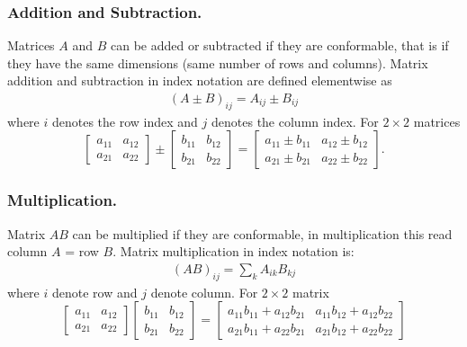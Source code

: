 \documentclass[../../../main.tex]{subfiles}
\begin{document}
\subsubsection{Addition and Subtraction.}
Matrices $A$ and $B$ can be added or subtracted if they are conformable, that is if they have the same dimensions (same number of rows and columns). 
Matrix addition and subtraction in index notation are defined elementwise as
\begin{align*}
(A \pm B)_{ij} = A_{ij} \pm B_{ij}
\end{align*}
where $i$ denotes the row index and $j$ denotes the column index.
For $2\times2$ matrices
\begin{equation*}
\begin{bmatrix}
a_{11} & a_{12} \\
a_{21} & a_{22}
\end{bmatrix}
\pm
\begin{bmatrix}
b_{11} & b_{12} \\
b_{21} & b_{22}
\end{bmatrix}
=
\begin{bmatrix}
a_{11}\pm b_{11} & a_{12}\pm b_{12} \\
a_{21}\pm b_{21} & a_{22}\pm b_{22}
\end{bmatrix}.
\end{equation*}

\subsubsection{Multiplication.}
Matrix $AB$ can be multiplied if they are conformable, in multiplication this read column $A$ = row $B$.
Matrix multiplication in index notation is:
\begin{align*}
	(AB)_{ij}=\sum_{k}A_{ik}B_{kj}
\end{align*}
where $i$ denote row and $j$ denote column.
For $2\times2$ matrix
\begin{equation*}
	\begin{bmatrix}
		a_{11} & a_{12} \\
		a_{21} & a_{22}
	\end{bmatrix}
	\begin{bmatrix}
		b_{11} & b_{12} \\
		b_{21} & b_{22}
	\end{bmatrix}=
	\begin{bmatrix}
		a_{11}b_{11} + a_{12}b_{21} & a_{11}b_{12} + a_{12}b_{22} \\
		a_{21}b_{11} + a_{22}b_{21} & a_{21}b_{12} + a_{22}b_{22}
	\end{bmatrix}
\end{equation*}
\end{document}
